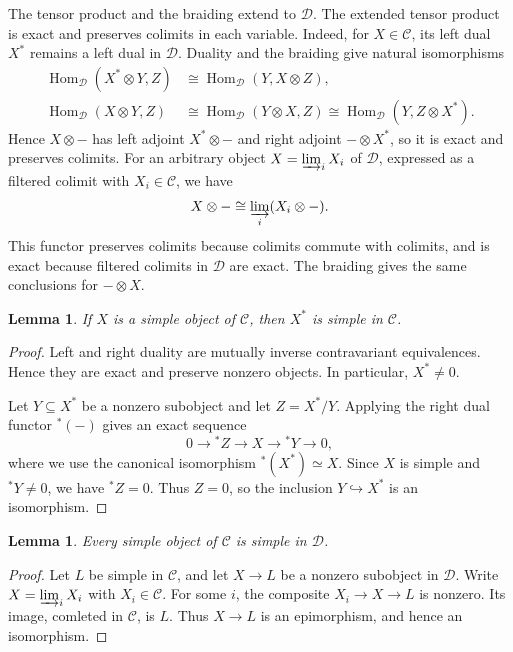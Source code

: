 \documentclass[11pt, a4paper]{article}
\numberwithin{equation}{section}
\newcommand{\C}{\mathcal C}
\newcommand{\D}{\mathcal D}
\newtheorem{lemma}[theorem]{Lemma}
\begin{document}
The tensor product and the braiding extend to $\D$. The extended
tensor product is exact and preserves colimits in each variable.
Indeed, for $X\in\C$, its left dual $X^*$ remains a left dual in
$\D$. Duality and the braiding give natural isomorphisms
\[
\begin{aligned}
 \operatorname{Hom}_{\D}(X^*\otimes Y,Z)
 &\cong \operatorname{Hom}_{\D}(Y,X\otimes Z),\\
 \operatorname{Hom}_{\D}(X\otimes Y,Z)
 &\cong \operatorname{Hom}_{\D}(Y\otimes X,Z)
 \cong \operatorname{Hom}_{\D}(Y,Z\otimes X^*).
\end{aligned}
\]
Hence $X\otimes-$ has left adjoint $X^*\otimes-$ and right adjoint
$-\otimes X^*$, so it is exact and preserves colimits.
For an arbitrary object $X=\varinjlim_i X_i$ of $\D$, expressed
as a filtered colimit with $X_i\in\C$, we have
\[
 X\otimes-\cong\varinjlim_i(X_i\otimes-).
\]
This functor preserves colimits because colimits commute with
colimits, and is exact because filtered colimits in $\D$ are exact.
The braiding gives the same conclusions for $-\otimes X$.



\begin{lemma}\label{pre:simple-dual}
If $X$ is a simple object of $\C$, then $X^*$ is simple
in $\C$.
\end{lemma}


\begin{proof}
Left and right duality are mutually inverse contravariant
equivalences. Hence they are exact and preserve nonzero objects.
In particular, $X^*\neq0$.


Let $Y\subseteq X^*$ be a nonzero subobject and let $Z=X^*/Y$.
Applying the right dual functor ${^*(-)}$ gives an exact sequence
\[
 0\longrightarrow {^*Z}\longrightarrow X
 \longrightarrow {^*Y}\longrightarrow0,
\]
where we use the canonical isomorphism ${^*(X^*)}\simeq X$.
Since $X$ is simple and ${^*Y}\neq0$, we have ${^*Z}=0$.
Thus $Z=0$, so the inclusion $Y\hookrightarrow X^*$ is an
isomorphism.
\end{proof}

\begin{lemma}\label{pre:simple-ind}
Every simple object of $\C$ is simple in $\D$.
\end{lemma}

\begin{proof}
Let $L$ be simple in $\C$, and let $X\longrightarrow L$ be a nonzero
subobject in $\D$. Write $X=\varinjlim_i X_i$ with $X_i\in\C$.
For some $i$, the composite $X_i\longrightarrow X\longrightarrow L$
is nonzero. Its image, comleted in $\C$, is $L$.
Thus $X\longrightarrow L$ is an epimorphism, and hence an isomorphism.
\end{proof}
\end{document}
